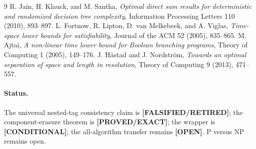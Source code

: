 \documentclass[11pt]{article}
\newcommand{\status}[1]{\textbf{[#1]}}
\begin{document}
\begin{thebibliography}{9}
R. Jain, H. Klauck, and M. Santha,
\emph{Optimal direct sum results for deterministic and randomized decision
tree complexity}, Information Processing Letters 110 (2010), 893--897.
L. Fortnow, R. Lipton, D. van Melkebeek, and A. Viglas,
\emph{Time-space lower bounds for satisfiability}, Journal of the ACM 52
(2005), 835--865.
M. Ajtai, \emph{A non-linear time lower bound for Boolean branching
programs}, Theory of Computing 1 (2005), 149--176.
J. H{\aa}stad and J. Nordstr{\"o}m,
\emph{Towards an optimal separation of space and length in resolution},
Theory of Computing 9 (2013), 471--557.
\end{thebibliography}

\paragraph{Status.}
The universal nested-tag consistency claim is
\status{FALSIFIED/RETIRED}; the component-erasure theorem is
\status{PROVED/EXACT}; the wrapper is \status{CONDITIONAL}; the
all-algorithm transfer remains \status{OPEN}.  P versus NP remains open.
\end{document}
